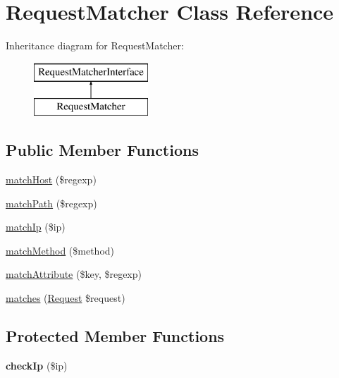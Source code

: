 \hypertarget{class_symfony_1_1_component_1_1_http_foundation_1_1_request_matcher}{
\section{\-Request\-Matcher \-Class \-Reference}
\label{class_symfony_1_1_component_1_1_http_foundation_1_1_request_matcher}
}
\-Inheritance diagram for \-Request\-Matcher\-:\begin{figure}[H]
\begin{center}
\leavevmode
\includegraphics[height=2.000000cm]{class_symfony_1_1_component_1_1_http_foundation_1_1_request_matcher}
\end{center}
\end{figure}
\subsection*{\-Public \-Member \-Functions}
\begin{DoxyCompactItemize}
\item 
\hyperlink{class_symfony_1_1_component_1_1_http_foundation_1_1_request_matcher_af36a818a0f181e90359ab39b515b4927}{match\-Host} (\$regexp)
\item 
\hyperlink{class_symfony_1_1_component_1_1_http_foundation_1_1_request_matcher_ada2b5f001e998eb5c0e37c766aeb8994}{match\-Path} (\$regexp)
\item 
\hyperlink{class_symfony_1_1_component_1_1_http_foundation_1_1_request_matcher_a6ebbb0ddb9de869d8ea13b42f9ac3093}{match\-Ip} (\$ip)
\item 
\hyperlink{class_symfony_1_1_component_1_1_http_foundation_1_1_request_matcher_a6fea55b79f9dd04965ea6dedd47d34e8}{match\-Method} (\$method)
\item 
\hyperlink{class_symfony_1_1_component_1_1_http_foundation_1_1_request_matcher_a30c55939256ea957fcfb09159677d099}{match\-Attribute} (\$key, \$regexp)
\item 
\hyperlink{class_symfony_1_1_component_1_1_http_foundation_1_1_request_matcher_a0b70e43609cb9ab9b5128af7b8f76a77}{matches} (\hyperlink{class_symfony_1_1_component_1_1_http_foundation_1_1_request}{\-Request} \$request)
\end{DoxyCompactItemize}
\subsection*{\-Protected \-Member \-Functions}
\begin{DoxyCompactItemize}
\item 
\hypertarget{class_symfony_1_1_component_1_1_http_foundation_1_1_request_matcher_ae0a6d5a50f37f2b367c858dedbdb35cb}{
{\bfseries check\-Ip} (\$ip)}
\label{class_symfony_1_1_component_1_1_http_foundation_1_1_request_matcher_ae0a6d5a50f37f2b367c858dedbdb35cb}

\end{DoxyCompactItemize}
